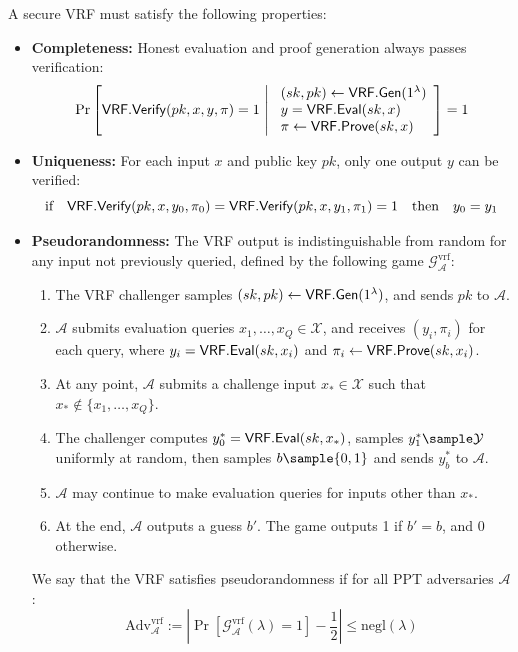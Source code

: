 A secure VRF must satisfy the following properties:

\begin{itemize}
    \item \textbf{Completeness:} Honest evaluation and proof generation always passes verification:
    \[
    \Pr\left[ \VRFVerify(pk,x,y,\pi) = 1 \ \middle| \ 
    \begin{array}{l}
        (sk, pk) \leftarrow \VRFGen(1^\lambda) \\
        y = \VRFEval(sk,x) \\
        \pi \leftarrow \VRFProve(sk,x)
    \end{array}
    \right] = 1
    \]
    
    \item \textbf{Uniqueness:} For each input $x$ and public key $pk$, only one output $y$ can be verified:
    \[
    \text{if} \quad \mathsf{VRF.Verify}(pk, x, y_0, \pi_0) = \mathsf{VRF.Verify}(pk, x, y_1, \pi_1) = 1 \quad \text{then} \quad y_0 = y_1
    \]
    
    \item \textbf{Pseudorandomness:} The VRF output is indistinguishable from random for any input not previously queried, defined by the following game $\mathcal{G}_{\mathcal{A}}^{\text{vrf}}$:
    \begin{enumerate}
        \item The VRF challenger samples $(sk, pk) \leftarrow \mathsf{VRF.Gen}(1^\lambda)$, and sends $pk$ to $\mathcal{A}$.
        \item $\mathcal{A}$ submits evaluation queries $x_1, \ldots, x_Q \in \mathcal{X}$, and receives $(y_i, \pi_i)$ for each query, where $y_i = \mathsf{VRF.Eval}(sk, x_i)$ and $\pi_i \leftarrow \mathsf{VRF.Prove}(sk, x_i)$.
        \item At any point, $\mathcal{A}$ submits a challenge input $x_* \in \mathcal{X}$ such that $x_* \not\in \{x_1, \ldots, x_Q\}$.
        \item The challenger computes $y_0^* = \mathsf{VRF.Eval}(sk, x_*)$, samples $y_1^* \sample \mathcal{Y}$ uniformly at random, then samples $b \sample \{0,1\}$ and sends $y_b^*$ to $\mathcal{A}$.
        \item $\mathcal{A}$ may continue to make evaluation queries for inputs other than $x_*$.
        \item At the end, $\mathcal{A}$ outputs a guess $b'$. The game outputs 1 if $b' = b$, and 0 otherwise.
    \end{enumerate}
    
    We say that the VRF satisfies pseudorandomness if for all PPT adversaries $\mathcal{A}$:
    \[
    \text{Adv}_{\mathcal{A}}^{\text{vrf}} := \left|\Pr\left[\mathcal{G}_{\mathcal{A}}^{\text{vrf}}(\lambda) = 1\right] - \frac{1}{2}\right| \leq \text{negl}(\lambda)
    \]
\end{itemize}


